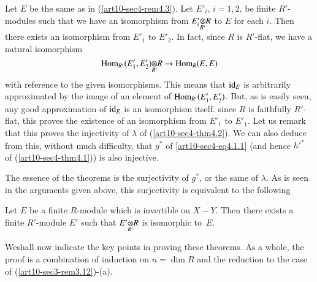 Let $E$ be the same as in (\ref{art10-sec4-rem4.3}). Let $E'_{i}$, $i=1,2$, be finite $R'$-modules such that we have an isomorphism from $\foprod{E'_{i}}{R}{R'}$ to $E$ for each $i$. Then there exists an isomorphism from $E'_{1}$ to $E'_{2}$. In fact, since $R$ is $R'$-flat, we have a natural isomorphism
$$
\foprod{\Hom_{R'}(E'_{1},E'_{2})}{R}{R'}\to \Hom_{R}(E,E)
$$
with reference to the given isomorphisms. This means that $\operatorname{\mathrm{id}}_{E}$ is arbitrarily approximated by the image of an element of $\operatorname{\mathrm{Hom}}_{R'}(E'_{1},E'_{2})$. But, as is easily seen, any good approximation of $\operatorname{\mathrm{id}}_{E}$ is an isomorphism itself. since $R$ is faithfully $R'$-flat, this proves the existence of an isomorphism from $E'_{1}$ to $E'_{1}$. Let us remark that this proves the injectivity of $\lambda$ of (\ref{art10-sec4-thm4.2}). We can also deduce from this, without much difficulty, that $g^{*}$ of \eqref{art10-sec4-eq4.1.1} (and hence ${h'}^{*}$ of (\ref{art10-sec4-thm4.1})) is also injective.

The essence of the theorems is the surjectivity of $g^{*}$, or the same of $\lambda$. As is seen in the arguments given above, this surjectivity is equivalent to the following

\begin{theorem}\label{art10-sec4-thm4.4}
Let $E$ be a finite $R$-module which is invertible on $X-Y$. Then there exists a finite $R'$-module $E'$ such that $\foprod{E'}{R}{R'}$ is isomorphic to~$E$.
\end{theorem}

We\pageoriginale shall now indicate the key points in proving these theorems. As a whole, the proof is a combination of induction on $n=\dim R$ and the reduction to the case of (\ref{art10-sec3-rem3.12})-(a).

